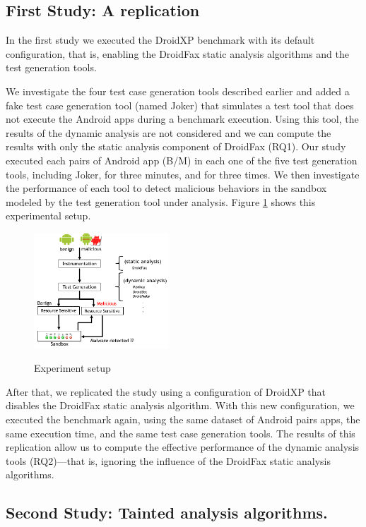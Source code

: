 \subsection{First Study: A replication \blls}

In the first study we executed the DroidXP benchmark with its
default configuration, that is, enabling the DroidFax
static analysis algorithms and the test generation tools.

We investigate the four test case generation tools described earlier and added a fake test
case generation tool (named Joker) that simulates a test tool that does not execute
the Android apps during a benchmark execution. Using this tool, the results
of the dynamic analysis are not considered and we can compute the results with
only the static analysis component of DroidFax (RQ1). Our study executed each pairs of
Android app (B/M) in each one of the five test generation tools, including Joker,
for three minutes, and for three times. We then investigate the performance of each tool to detect malicious behaviors in the sandbox modeled by the test generation tool
under analysis. Figure \ref{fig:setup} shows this experimental setup.

\begin{figure}[ht]
   \includegraphics[width=0.45\textwidth]{images/setup2.png}
   \label{Experiment setup}
   \caption{Experiment setup}
   \label{fig:setup}
 \end{figure}

After that, we replicated the study using a configuration of DroidXP that disables the DroidFax static analysis algorithm. With this new configuration, we executed the benchmark again, using the same dataset of Android pairs apps, the same execution time, and the same test case generation tools.
The results of this replication allow us to compute the effective performance
of the dynamic analysis tools (RQ2)---that is, ignoring the influence of the
DroidFax static analysis algorithms.

\subsection{Second Study: Tainted analysis algorithms.}

